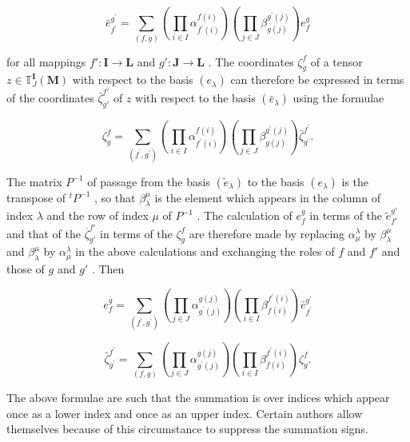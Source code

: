 \[
\bar {e} _ {f ^ {\prime}} ^ {g ^ {\prime}} = \sum_ {(f, g)} \left(\prod_ {i \in I} \alpha_ {f ^ {\prime} (i)} ^ {f (i)}\right) \left(\prod_ {j \in J} \beta_ {g (j)} ^ {g ^ {\prime} (j)}\right) e _ {f} ^ {g}
\]

for all mappings \(f': \mathbf{I} \to \mathbf{L}\) and \(g': \mathbf{J} \to \mathbf{L}\) . The coordinates \(\zeta_g^f\) of a tensor \(z \in \mathbb{T}_J^{\mathbf{I}}(\mathbf{M})\) with respect to the basis \((e_{\lambda})\) can therefore be expressed in terms of the coordinates \(\bar{\zeta}_{g'}^{f'}\) of \(z\) with respect to the basis \((\bar{e}_{\lambda})\) using the formulae

\[
\zeta_ {g} ^ {f} = \sum_ {(f ^ {\prime}, g ^ {\prime})} \left(\prod_ {i \in I} \alpha_ {f ^ {\prime} (i)} ^ {f (i)}\right) \left(\prod_ {j \in J} \beta_ {g (j)} ^ {g ^ {\prime} (j)}\right) \bar {\zeta} _ {g ^ {\prime}} ^ {f ^ {\prime}}.\tag{21}
\]

The matrix \(P^{-1}\) of passage from the basis \((\tilde{e}_{\lambda})\) to the basis \((e_{\lambda})\) is the transpose of \(^{t}P^{-1}\) , so that \(\beta_{\lambda}^{\mu}\) is the element which appears in the column of index \(\lambda\) and the row of index \(\mu\) of \(P^{-1}\) . The calculation of \(e_{f}^{g}\) in terms of the \(\tilde{e}_{f'}^{g'}\) and that of the \(\overline{\zeta}_{g'}^{f'}\) in terms of the \(\zeta_{g}^{f}\) are therefore made by replacing \(\alpha_{\mu}^{\lambda}\) by \(\beta_{\lambda}^{\mu}\) and \(\beta_{\lambda}^{\mu}\) by \(\alpha_{\mu}^{\lambda}\) in the above calculations and exchanging the roles of \(f\) and \(f'\) and those of \(g\) and \(g'\) . Then

\[
e _ {f} ^ {g} = \sum_ {(f ^ {\prime}, g ^ {\prime})} \left(\prod_ {j \in J} \alpha_ {g ^ {\prime} (j)} ^ {g (j)}\right) \left(\prod_ {i \in I} \beta_ {f (i)} ^ {f ^ {\prime} (i)}\right) \bar {e} _ {f ^ {\prime}} ^ {g ^ {\prime}}\tag{22}
\]

\[
\bar {\zeta} _ {g ^ {\prime}} ^ {f ^ {\prime}} = \sum_ {(f, g)} \left(\prod_ {j \in J} \alpha_ {g ^ {\prime} (j)} ^ {g (j)}\right) \left(\prod_ {i \in I} \beta_ {f (i)} ^ {f ^ {\prime} (i)}\right) \zeta_ {g} ^ {f}.\tag{23}
\]

The above formulae are such that the summation is over indices which appear once as a lower index and once as an upper index. Certain authors allow themselves because of this circumstance to suppress the summation signs.

